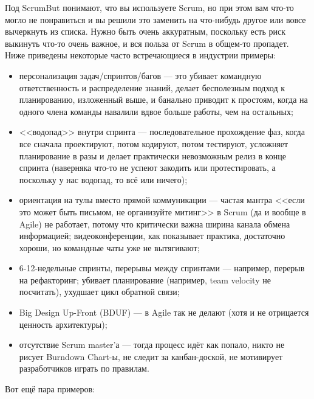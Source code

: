 \documentclass{../../text-style}
\begin{document}
Под ScrumBut понимают, что вы используете Scrum, но при этом вам что-то могло не понравиться и вы решили это заменить на что-нибудь другое или вовсе вычеркнуть из списка. Нужно быть очень аккуратным, поскольку есть риск выкинуть что-то очень важное, и вся польза от Scrum в общем-то пропадет. Ниже приведены некоторые часто встречающиеся в индустрии примеры:

\begin{itemize}
    \item персонализация задач/спринтов/багов --- это убивает командную ответственность и распределение знаний, делает бесполезным подход к планированию, изложенный выше, и банально приводит к простоям, когда на одного члена команды навалили вдвое больше работы, чем на остальных;
    \item <<водопад>> внутри спринта --- последовательное прохождение фаз, когда все сначала проектируют, потом кодируют, потом тестируют, усложняет планирование в разы и делает практически невозможным релиз в конце спринта (наверняка что-то не успеют закодить или протестировать, а поскольку у нас водопад, то всё или ничего);
    \item ориентация на тулы вместо прямой коммуникации --- частая мантра <<если это может быть письмом, не организуйте митинг>> в Scrum (да и вообще в Agile) не работает, потому что критически важна ширина канала обмена информацией; видеоконференции, как показывает практика, достаточно хороши, но командные чаты уже не вытягивают;
    \item 6-12-недельные спринты, перерывы между спринтами --- например, перерыв на рефакторинг; убивает планирование (например, team velocity не посчитать), ухудшает цикл обратной связи;
    \item Big Design Up-Front (BDUF) --- в Agile так не делают (хотя и не отрицается ценность архитектуры);
    \item отсутствие Scrum master’а --- тогда процесс идёт как попало, никто не рисует Burndown Chart-ы, не следит за канбан-доской, не мотивирует разработчиков играть по правилам.
\end{itemize}

Вот ещё пара примеров:
\end{document}

